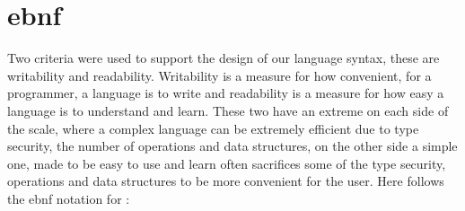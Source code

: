 \begin{comment}
\section{EBNF}
To explain the language syntax, an \emph{EBNF} notation is used.
EBNF is an abbreviation for \emph{Extended Backus-Naur form} and is a modified version of \emph{BNF} (Backus-Naur form).
EBNF is a notation technique to describe the syntax of languages and is often used for computer programming languages. EBNF is a set of derivation rules, meaning that a 'word' on the left side (called a non-terminal) is substituted with the words on the right side.\\
Example:\\
{\begin{lstlisting}[numbers=none]
full-name = name, last-name, $ | name, full-name

name> = first-name | middle-name
\end{lstlisting}}
Translation:
\begin{itemize}
	\item A full-name consists of a name, followed by a last-name and end-of-line, or a name, followed by full-name.
	\item A name consists of a first-name or a middle-name
\end{itemize}
\pagebreak
\end{comment}


\section{\langname{} \ac{ebnf}}

Two criteria were used to support the design of our language syntax, these are writability and readability. Writability is a measure for how convenient, for a programmer, a language is to write and readability is a measure for how easy a language is to understand and learn. These two have an extreme on each side of the scale, where a complex language can be extremely efficient due to type security, the number of operations and data structures, on the other side a simple one, made to be easy to use and learn often sacrifices some of the type security, operations and data structures to be more convenient for the user.
Here follows the \ac{ebnf} notation for \langname{}:

